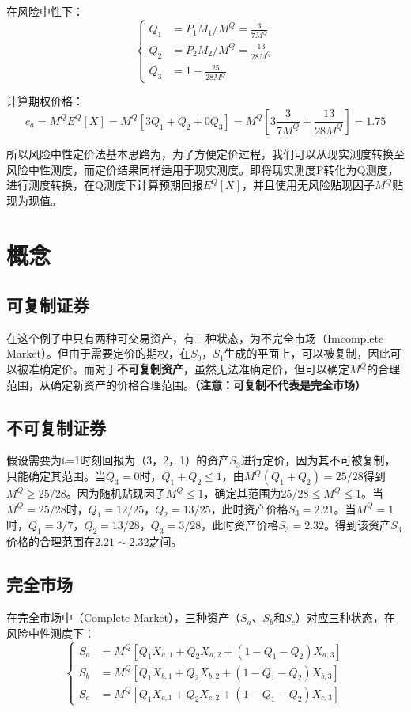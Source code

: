 \documentclass[11pt]{article}
\begin{document}
在风险中性下：
\begin{equation*}
  \left\{
  \begin{aligned}
    Q_1 &= P_1M_1 / M^Q = \frac{3}{7 M^Q} \\ 
    Q_2 &= P_2M_2 / M^Q = \frac{13}{28 M^Q}\\
    Q_3 &= 1 - \frac{25}{28 M^Q}
  \end{aligned}
  \right.
\end{equation*}

计算期权价格：
\begin{equation*}
 c_a = M^Q E^Q[X] = M^Q [3Q_1 + Q_2 + 0Q_3] = M^Q [3\frac{3}{7M^Q} + \frac{13}{28M^Q}] = 1.75
\end{equation*}

所以风险中性定价法基本思路为，为了方便定价过程，我们可以从现实测度转换至风险中性测度，而定价结果同样适用于现实测度。即将现实测度P转化为Q测度，进行测度转换，在Q测度下计算预期回报$E^Q[X]$，并且使用无风险贴现因子$M^Q$贴现为现值。

\section{概念}

\subsection*{可复制证券}
在这个例子中只有两种可交易资产，有三种状态，为不完全市场（Imcomplete Market）。但由于需要定价的期权，在$S_0$，$S_1$生成的平面上，可以被复制，因此可以被准确定价。而对于\textbf{不可复制资产}，虽然无法准确定价，但可以确定$M^Q$的合理范围，从确定新资产的价格合理范围。\textbf{（注意：可复制不代表是完全市场）}

\subsection*{不可复制证券}
假设需要为t=1时刻回报为（3，2，1）的资产$S_3$进行定价，因为其不可被复制，只能确定其范围。当$Q_3=0$时，$Q_1+Q_2\leq1$，由$M^Q(Q_1 + Q_2) = 25/28$得到$M^Q\geq25/28$。因为随机贴现因子$M^Q\leq1$，确定其范围为$ 25/28\leq M^Q\leq1$。当$M^Q=25/28$时，$Q_1=12/25$，$Q_2=13/25$，此时资产价格$S_3=2.21$。当$M^Q=1$时，$Q_1=3/7$，$Q_2=13/28$，$Q_3=3/28$，此时资产价格$S_3 = 2.32$。得到该资产$S_3$价格的合理范围在$2.21 \sim 2.32$之间。

\subsection*{完全市场}
在完全市场中（Complete Market），三种资产（$S_a$、$S_b$和$S_c$）对应三种状态，在风险中性测度下：
\begin{equation*}
  \left\{
    \begin{aligned}
      S_a &= M^Q[Q_1X_{a,1} + Q_2X_{a,2} + (1-Q_1-Q_2)X_{a,3}] \\
      S_b &= M^Q[Q_1X_{b,1} + Q_2X_{b,2} + (1-Q_1-Q_2)X_{b,3}] \\
      S_c &= M^Q[Q_1X_{c,1} + Q_2X_{c,2} + (1-Q_1-Q_2)X_{c,3}]
    \end{aligned}
  \right.
\end{equation*}
\end{document}
